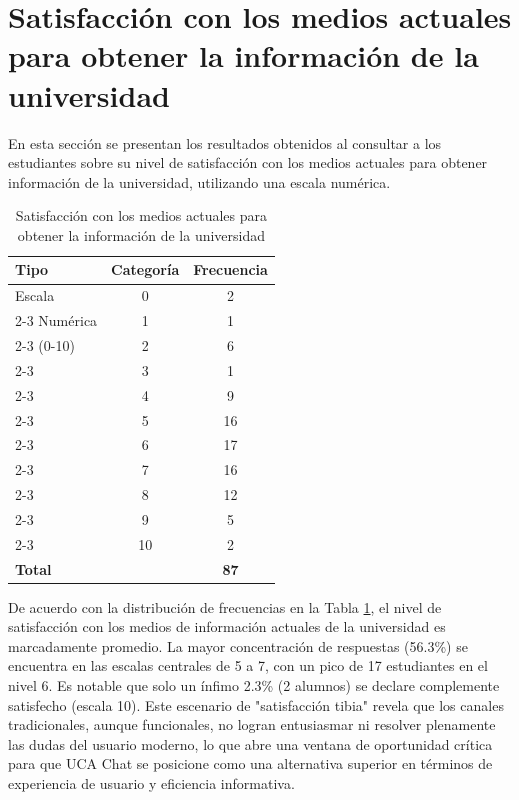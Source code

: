 {{\section{Satisfacción con los medios actuales para obtener la información de la universidad}
En esta sección se presentan los resultados obtenidos al consultar a los estudiantes sobre su nivel de satisfacción con los medios actuales para obtener información de la universidad, utilizando una escala numérica.

\begin{table}[H]
    \centering
    \caption{Satisfacción con los medios actuales para obtener la información de la universidad}
    \begin{tabular}{|l|c|c|}
        \hline
        \textbf{Tipo} & \textbf{Categoría} & \textbf{Frecuencia} \\ \hline
        Escala & 0 & 2 \\ \cline{2-3} 
        Numérica & 1 & 1 \\ \cline{2-3} 
        (0-10) & 2 & 6 \\ \cline{2-3} 
         & 3 & 1 \\ \cline{2-3} 
         & 4 & 9 \\ \cline{2-3} 
         & 5 & 16 \\ \cline{2-3} 
         & 6 & 17 \\ \cline{2-3} 
         & 7 & 16 \\ \cline{2-3} 
         & 8 & 12 \\ \cline{2-3} 
         & 9 & 5 \\ \cline{2-3} 
         & 10 & 2 \\ \hline
        \textbf{Total} & \multicolumn{1}{c|}{} & \textbf{87} \\ \hline
    \end{tabular}
    \label{tab:satisfaccion_medios_actuales}
\end{table}

De acuerdo con la distribución de frecuencias en la Tabla \ref{tab:satisfaccion_medios_actuales}, el nivel de satisfacción con los medios de información actuales de la universidad es marcadamente promedio. La mayor concentración de respuestas (56.3\%) se encuentra en las escalas centrales de 5 a 7, con un pico de 17 estudiantes en el nivel 6. Es notable que solo un ínfimo 2.3\% (2 alumnos) se declare complemente satisfecho (escala 10). Este escenario de "satisfacción tibia" revela que los canales tradicionales, aunque funcionales, no logran entusiasmar ni resolver plenamente las dudas del usuario moderno, lo que abre una ventana de oportunidad crítica para que UCA Chat se posicione como una alternativa superior en términos de experiencia de usuario y eficiencia informativa.

}}
